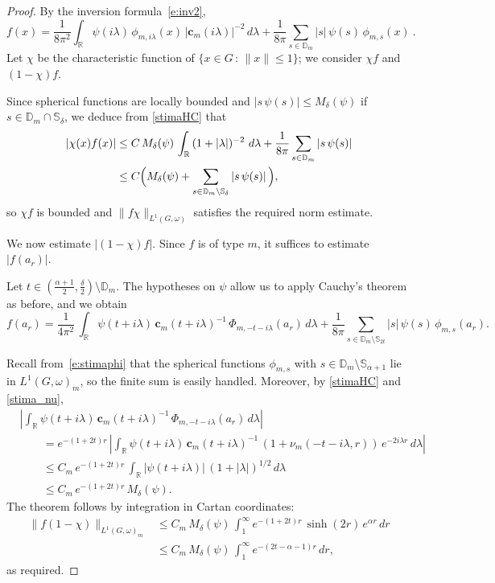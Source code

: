 \documentclass[12pt,a4paper]{amsart}
\theoremstyle{definition}
\theoremstyle{remark}
\numberwithin{equation}{section}
\newcommand{\R}{\mathbb{R}}
\newcommand{\Strip}{\mathbb{S}}
\newcommand{\Discr}{\mathbb{D}_m}
\newcommand{\bfc}{\mathbf{c}_m}
\def\beas{\begin{equation*}\begin{aligned}}
\def\eeas{\end{aligned}\end{equation*}}
\newcommand{\var}{s}
\begin{document}
\begin{proof} 
By the inversion formula~\eqref{e:inv2}, 
\[
f(x)
=\frac{1}{8\pi^2}\int_\R\psi(i\lambda)\,\phi_{m,i\lambda}(x)\,|\bfc(i\lambda)|^{-2}
\, d\lambda
+\frac{1}{8\pi}\sum_{\var\in \Discr}|\var|\, \psi(\var)\, \phi_{m,\var}(x)\ .
\]
Let $\chi$ be the characteristic function of $\{x\in G\, :\, \|x\|\le 1\}$; we consider $\chi f$ and $(1-\chi)f$.


Since spherical functions are locally bounded and $|\var\, \psi(\var)|\le M_\delta(\psi)$ if $\var\in \Discr\cap \Strip_\delta$, we deduce from \eqref{stimaHC} that
\beas
 |\chi(x)f(x)|
 & \leq C \,M_\delta(\psi)\, \int_\R \, (1+|\lambda|)^{-2}\,\, d\lambda +\frac{1}{8\pi}\sum_{\var\in \Discr}|\var\, \psi(\var)|
 \\
 &\leq C \Bigl(M_\delta(\psi)+
\sum_{\var\in \Discr\setminus \Strip_\delta} |\var\,\psi(\var)|\,
\Bigr),
\eeas
so $\chi f$ is bounded and $\|f\chi\|_{L^1(G,\omega)}$ satisfies the required norm estimate.

We now estimate $|(1 - \chi) f|$. 
Since $f$ is of type $m$, it suffices to estimate $|f(a_r)|$. 
 
Let  $t\in (\frac{\alpha+1}2,\frac{\delta}{2})\setminus\Discr$. 
The hypotheses  on  $\psi$ allow us to apply Cauchy's theorem as before, and we  obtain
\[
f(a_r)=\frac{1}{4\pi^2} \,\int_\R\psi(t+i\lambda)\,
\mathbf{c}_m(t+i\lambda)^{-1}\, \Phi_{m,-t-i\lambda}(a_r) \, d\lambda
+\frac{1}{8\pi}\sum_{ \var\in \Discr\setminus \Strip_{2t}}|\var|\, \psi(\var)\, \phi_{m,\var}(a_r).
\]

Recall from~\eqref{e:stimaphi} that the spherical functions $\phi_{m,\var}$ with $\var\in \Discr\setminus\Strip_{\alpha+1}$ lie in $L^1(G,\omega)_m$, so the finite sum is easily handled. Moreover,   by   \eqref{stimaHC}  and \eqref{stima_nu},
\begin{align*}
&\left|\int_\R\psi(t+i\lambda)\,
\mathbf{c}_m(t+i\lambda)^{-1}\, \Phi_{m,-t-i\lambda}(a_r) \, d\lambda
\right|
\\&\qquad=
e^{-(1+2t)r}\, 
\left|
\int_\R\psi(t+i\lambda)\,
\mathbf{c}_m(t+i\lambda)^{-1}\, (1+\nu_m(-t-i\lambda,r))\, e^{-2i\lambda r}\, d\lambda
\right|
\\
&\qquad\leq  
C_m \,e^{-(1+2t)r}\, \int_\R|\psi(t+i\lambda)|\,(1+|\lambda|)^{1/2}\, d\lambda
\\
&\qquad\leq 
C_m \,e^{-(1+2t)r}\, M_\delta(\psi).
\end{align*}
The theorem follows by integration in Cartan coordinates:
\begin{align*}
\|f(1-\chi)\|_{L^1(G,\omega)_m}
&\leq C_m \, M_\delta(\psi)\,\int_1^\infty e^{-(1+2t)r}\, \sinh (2r)\, e^{\alpha r}\, dr
\\
&\leq C_m \, M_\delta(\psi)\,\int_1^\infty e^{-(2t-\alpha-1)r}\, dr,
\end{align*}
as required.
\end{proof}
 
\end{document}
